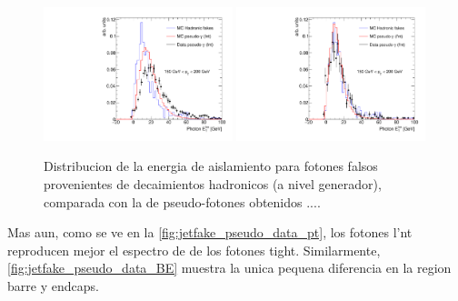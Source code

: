 \begin{figure}[h]
  \centering

  \includegraphics[width=0.49\textwidth]{figures/bkg_mc_pseudo_data_SR_l_ptbin}
  \includegraphics[width=0.49\textwidth]{figures/bkg_mc_pseudo_data_SR_lp_ptbin}

  \caption{Distribucion de la energia de aislamiento para fotones falsos provenientes de decaimientos hadronicos (a nivel generador), comparada con la de pseudo-fotones
    obtenidos ....}
  \label{fig:jetfake_mc_data}

\end{figure}

Mas aun, como se ve en la \cref{fig:jetfake_pseudo_data_pt}, los fotones l'nt
reproducen mejor el espectro de {\pt} de los fotones tight. Similarmente, \cref{fig:jetfake_pseudo_data_BE}
muestra la unica pequena diferencia en la region barre y endcaps.


